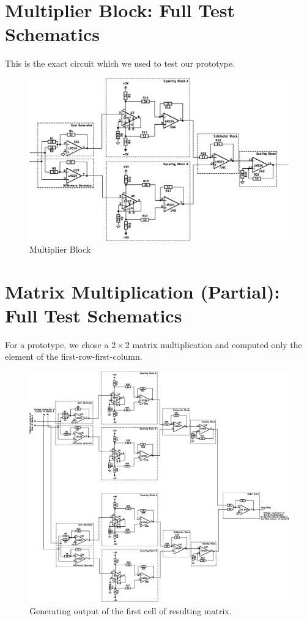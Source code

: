 \section{Multiplier Block: Full Test Schematics}
This is the exact circuit which we used to test our prototype.
\begin{figure}[h]
	\centering
	\includegraphics[width=\columnwidth]{fig/ckt5.eps}
	\caption{Multiplier Block}
	\label{ckt5}
\end{figure}

\newpage
\section{Matrix Multiplication (Partial): Full Test Schematics}
For a prototype, we chose a $ 2 \times 2 $ matrix multiplication and computed only the element of the first-row-first-column.

\begin{figure}[h]
	\centering
	\includegraphics[width=\columnwidth]{fig/ckt7.eps}
	\caption{Generating output of the first cell of resulting matrix.}
	\label{ckt7}
\end{figure}